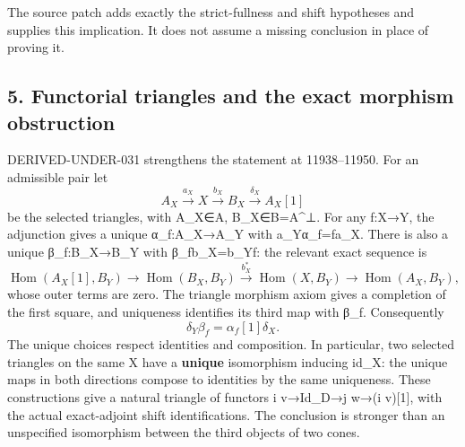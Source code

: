 \documentclass[11pt]{article}
\begin{document}
The source patch adds exactly the strict-fullness and shift hypotheses and supplies this implication. It does not assume a missing conclusion in place of proving it.

\subsection{5. Functorial triangles and the exact morphism obstruction}\label{proofs-11665-12003-functorial-triangles-and-the-exact-morphism-obstruction}

DERIVED-UNDER-031 strengthens the statement at 11938–\allowbreak{}11950. For an admissible pair let \[
 A_X\xrightarrow{a_X}X\xrightarrow{b_X}B_X
 \xrightarrow{\delta_X}A_X[1]
\] be the selected triangles,\allowbreak{} with A\_\allowbreak{}X\allowbreak{}∈A,\allowbreak{} B\_\allowbreak{}X\allowbreak{}∈B\allowbreak{}=A\textasciicircum{}⊥. For any f:\allowbreak{}X\allowbreak{}→Y,\allowbreak{} the adjunction gives a unique α\_\allowbreak{}f:\allowbreak{}A\_\allowbreak{}X\allowbreak{}→A\_\allowbreak{}Y with a\_\allowbreak{}Yα\_\allowbreak{}f\allowbreak{}=fa\_\allowbreak{}X. There is also a unique β\_\allowbreak{}f:\allowbreak{}B\_\allowbreak{}X\allowbreak{}→B\_\allowbreak{}Y with β\_\allowbreak{}fb\_\allowbreak{}X\allowbreak{}=b\_\allowbreak{}Yf:\allowbreak{} the relevant exact sequence is \[
 \operatorname{Hom}(A_X[1],B_Y)\longrightarrow
 \operatorname{Hom}(B_X,B_Y)\xrightarrow{b_X^*}
 \operatorname{Hom}(X,B_Y)\longrightarrow\operatorname{Hom}(A_X,B_Y),
\] whose outer terms are zero. The triangle morphism axiom gives a completion of the first square,\allowbreak{} and uniqueness identifies its third map with β\_\allowbreak{}f. Consequently \[
 \delta_Y\beta_f=\alpha_f[1]\delta_X.
\] The unique choices respect identities and composition. In particular,\allowbreak{} two selected triangles on the same X have a \textbf{unique} isomorphism inducing id\_\allowbreak{}X:\allowbreak{} the unique maps in both directions compose to identities by the same uniqueness. These constructions give a natural triangle of functors i v\allowbreak{}→Id\_\allowbreak{}D\allowbreak{}→j w\allowbreak{}→(i v)\allowbreak{}[1]\allowbreak{},\allowbreak{} with the actual exact-adjoint shift identifications. The conclusion is stronger than an unspecified isomorphism between the third objects of two cones.
\end{document}
